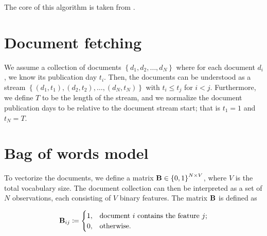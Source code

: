 

\newcommand{\doccount}{N}
\newcommand{\featcount}{V}
\newcommand{\streamlen}{T}
\newcommand{\traj}{y}
\newcommand{\df}{DF}
\newcommand{\featset}{\text{M}}

\newcommand{\docoverlap}{d}

\newcommand{\bowmat}{\mat{B}}
\newcommand{\dtdmat}{\mat{D}}
\newcommand{\trajmat}{\mat{T}}


The core of this algorithm is taken from \cite{event-detection}.

\section{Document fetching}
We assume a collection of documents $\left\{ d_{1}, d_{2}, \dots, d_{\doccount} \right\}$ where for each document $d_{i}$, we know its publication day $t_{i}$. Then, the documents can be understood as a stream $\left\{ (d_{1}, t_{1}), (d_{2}, t_{2}), \dots, (d_{\doccount}, t_{\doccount}) \right\}$ with $t_{i} \leq t_{j}$ for $i < j$. Furthermore, we define $\streamlen$ to be the length of the stream, and we normalize the document publication days to be relative to the document stream start; that is $t_{1} = 1$ and $t_{\doccount} = \streamlen$.


\section{Bag of words model}
To vectorize the documents, we define a matrix $\bowmat \in \left\{ 0, 1 \right\}^{\doccount \times \featcount}$, where $\featcount$ is the total vocabulary size. The document collection can then be interpreted as a set of $\doccount$ observations, each consisting of $\featcount$ binary features. The matrix $\bowmat$ is defined as

\begin{equation} \label{eq:bow-matrix}
	\bowmat_{ij} \coloneqq
	\begin{cases}
		1, & \text{document}~i~\text{contains the feature}~j \text{;} \\
		0, & \text{otherwise.}
	\end{cases}
\end{equation}

